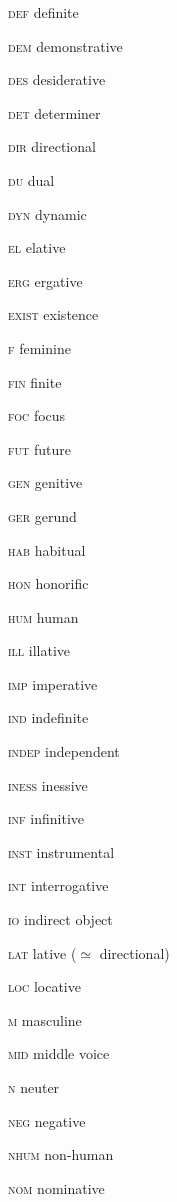 \begin{refsection}
\begin{multicols}{2}
	\textsc{def}  definite
	
	\textsc{dem}  demonstrative
	
	\textsc{des}  desiderative
	
	\textsc{det}  determiner
	
	\textsc{dir}  directional
	
	\textsc{du}  dual
	
	\textsc{dyn}  dynamic
	
	\textsc{el}  elative
	
	\textsc{erg}  ergative
	
	\textsc{exist}  existence
	
	\textsc{f}  feminine
	
	\textsc{fin}  finite
	
	\textsc{foc}  focus
	
	\textsc{fut}  future
	
	\textsc{gen}  genitive

	
	\textsc{ger}  gerund
	
	\textsc{hab}  habitual
	
	\textsc{hon}  honorific
	
	\textsc{hum}  human
	
	\textsc{ill}  illative
	
	\textsc{imp}  imperative
	
	\textsc{ind}  indefinite
	
	\textsc{indep}  independent
	
	\textsc{iness}  inessive
	
	\textsc{inf}  infinitive
	
	\textsc{inst}  instrumental
	
	\textsc{int}  interrogative
	
	\textsc{io}  indirect object
	
	\textsc{lat}  lative (${\simeq}$ directional)
	
	\textsc{loc}  locative
	
	\textsc{m}  masculine
	
	\textsc{mid}  middle voice
	
	\textsc{n}  neuter
	
	\textsc{neg}  negative
	
	\textsc{nhum}  non-human
	
	\textsc{nom}  nominative
	

\end{multicols}
\end{refsection}
